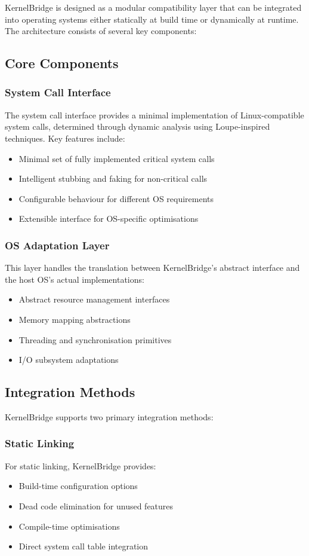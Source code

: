 \documentclass[conference]{IEEEtran}
\begin{document}
KernelBridge is designed as a modular compatibility layer that can be integrated into operating systems either statically at build time or dynamically at runtime. The architecture consists of several key components:

\subsection{Core Components}
\subsubsection{System Call Interface}
The system call interface provides a minimal implementation of Linux-compatible system calls, determined through dynamic analysis using Loupe-inspired techniques. Key features include:
\begin{itemize}
	\item Minimal set of fully implemented critical system calls
	\item Intelligent stubbing and faking for non-critical calls
	\item Configurable behaviour for different OS requirements
	\item Extensible interface for OS-specific optimisations
\end{itemize}

\subsubsection{OS Adaptation Layer}
This layer handles the translation between KernelBridge's abstract interface and the host OS's actual implementations:
\begin{itemize}
	\item Abstract resource management interfaces
	\item Memory mapping abstractions
	\item Threading and synchronisation primitives
	\item I/O subsystem adaptations
\end{itemize}

\subsection{Integration Methods}
KernelBridge supports two primary integration methods:

\subsubsection{Static Linking}
For static linking, KernelBridge provides:
\begin{itemize}
	\item Build-time configuration options
	\item Dead code elimination for unused features
	\item Compile-time optimisations
	\item Direct system call table integration
\end{itemize}
\end{document}
